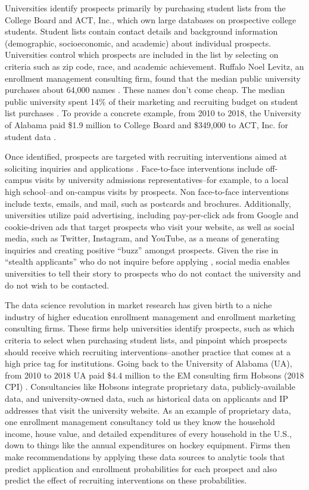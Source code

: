 \documentclass{article}
\begin{document}
Universities identify prospects primarily by purchasing student lists from the College Board and ACT, Inc., which own large databases on prospective college students. Student lists contain contact details and background information (demographic, socioeconomic, and academic) about individual prospects. Universities control which prospects are included in the list by selecting on criteria such as zip code, race, and academic achievement. Ruffalo Noel Levitz, an enrollment management consulting firm, found that the median public university purchases about 64,000 names \citep{RN4314}. These names don't come cheap. The median public university spent 14\% of their marketing and recruiting budget on student list purchases \citep{RN4402}. To provide a concrete example, from 2010 to 2018, the University of Alabama paid \$1.9 million to College Board and \$349,000 to ACT, Inc. for student data \citep{RN4035}.

Once identified, prospects are targeted with recruiting interventions aimed at soliciting inquiries and applications \citep{RN4323, RN4402}. Face-to-face interventions include off-campus visits by university admissions representatives--for example, to a local high school--and on-campus visits by prospects. Non face-to-face interventions include texts, emails, and mail, such as postcards and brochures. Additionally, universities utilize paid advertising, including pay-per-click ads from Google and cookie-driven ads that target prospects who visit your website, as well as social media, such as Twitter, Instagram, and YouTube, as a means of generating inquiries and creating positive ``buzz'' amongst prospects. Given the rise in ``stealth applicants'' who do not inquire before applying \citep{RN4411}, social media enables universities to tell their story to prospects who do not contact the university and do not wish to be contacted.

The data science revolution in market research has given birth to a niche industry of higher education enrollment management and enrollment marketing consulting firms. These firms help universities identify prospects, such as which criteria to select when purchasing student lists, and pinpoint which prospects should receive which recruiting interventions--another practice that comes at a high price tag for institutions. Going back to the University of Alabama (UA), from 2010 to 2018 UA paid \$4.4 million to the EM consulting firm Hobsons (2018 CPI) \citep{RN4035}. Consultancies like Hobsons integrate proprietary data, publicly-available data, and university-owned data, such as historical data on applicants and IP addresses that visit the university website. As an example of proprietary data, one enrollment management consultancy told us they know the household income, house value, and detailed expenditures of every household in the U.S., down to things like the annual expenditures on hockey equipment. Firms then make recommendations by applying these data sources to analytic tools that predict application and enrollment probabilities for each prospect and also predict the effect of recruiting interventions on these probabilities.
\end{document}

